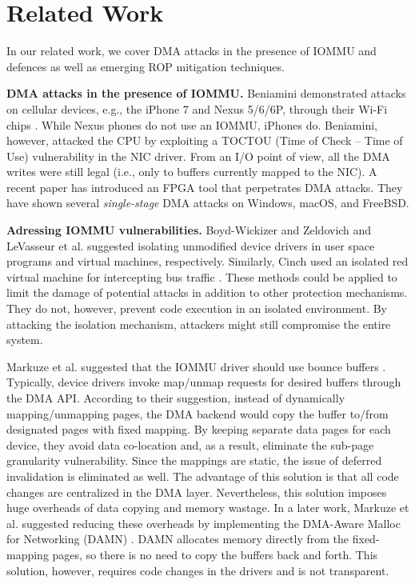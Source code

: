 \section{Related Work}
In our related work, we cover DMA attacks in the presence of IOMMU and defences as well as emerging ROP mitigation techniques.

\smallskip
\noindent\textbf{DMA attacks in the presence of IOMMU.}
Beniamini demonstrated attacks on cellular devices, e.g., the iPhone 7 and Nexus 5/6/6P, through their Wi-Fi chips \cite{Ben17a, Ben17b}. While Nexus phones do not use an IOMMU, iPhones do. Beniamini, however, attacked the CPU by exploiting a TOCTOU (Time of Check – Time of Use) vulnerability in the NIC driver. From an I/O point of view, all the DMA writes were still legal (i.e., only to buffers currently mapped to the NIC). A recent paper \cite{thunder} has introduced an FPGA tool that perpetrates DMA attacks. They have shown several \emph{single-stage} DMA attacks on Windows, macOS, and FreeBSD.

\smallskip
\noindent\textbf{Adressing IOMMU vulnerabilities.}
Boyd-Wickizer and Zeldovich \cite{BWZ10} and LeVasseur et al. \cite{LUSG04} suggested isolating unmodified device drivers in user space programs and virtual machines, respectively. Similarly, Cinch used an isolated red virtual machine for intercepting bus traffic \cite{AWH16}. These methods could be applied to limit the damage of potential attacks in addition to other protection mechanisms. They do not, however, prevent code execution in an isolated environment. By attacking the isolation mechanism, attackers might still compromise the entire system.

Markuze et al. suggested that the IOMMU driver should use bounce buffers \cite{MMT16}. Typically, device drivers invoke map/unmap requests for desired buffers through the DMA API. According to their suggestion, instead of dynamically mapping/unmapping pages, the DMA backend would copy the buffer to/from designated pages with fixed mapping. By keeping separate data pages for each device, they avoid data co-location and, as a result, eliminate the sub-page granularity vulnerability. Since the mappings are static, the issue of deferred invalidation is eliminated as well. The advantage of this solution is that all code changes are centralized in the DMA layer. Nevertheless, this solution imposes huge overheads of data copying and memory wastage. In a later work, Markuze et al. suggested reducing these overheads by implementing the DMA-Aware Malloc for Networking (DAMN) \cite{MSMT18}. DAMN allocates memory directly from the fixed-mapping pages, so there is no need to copy the buffers back and forth. This solution, however, requires code changes in the drivers and is not transparent.


